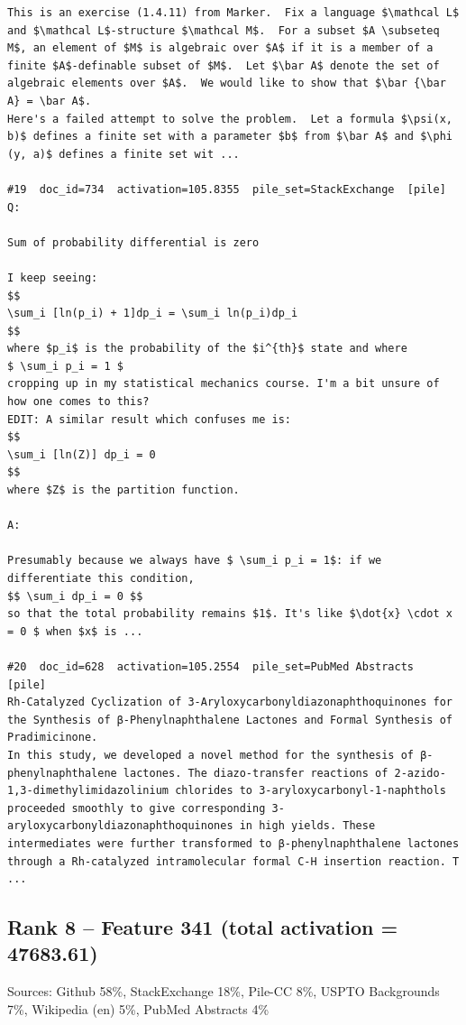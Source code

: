 \begin{verbatim}
This is an exercise (1.4.11) from Marker.  Fix a language $\mathcal L$ and $\mathcal L$-structure $\mathcal M$.  For a subset $A \subseteq M$, an element of $M$ is algebraic over $A$ if it is a member of a finite $A$-definable subset of $M$.  Let $\bar A$ denote the set of algebraic elements over $A$.  We would like to show that $\bar {\bar A} = \bar A$.
Here's a failed attempt to solve the problem.  Let a formula $\psi(x, b)$ defines a finite set with a parameter $b$ from $\bar A$ and $\phi (y, a)$ defines a finite set wit ...

#19  doc_id=734  activation=105.8355  pile_set=StackExchange  [pile]
Q:

Sum of probability differential is zero

I keep seeing:
$$
\sum_i [ln(p_i) + 1]dp_i = \sum_i ln(p_i)dp_i
$$
where $p_i$ is the probability of the $i^{th}$ state and where
$ \sum_i p_i = 1 $
cropping up in my statistical mechanics course. I'm a bit unsure of how one comes to this?
EDIT: A similar result which confuses me is:
$$
\sum_i [ln(Z)] dp_i = 0
$$
where $Z$ is the partition function.

A:

Presumably because we always have $ \sum_i p_i = 1$: if we differentiate this condition,
$$ \sum_i dp_i = 0 $$
so that the total probability remains $1$. It's like $\dot{x} \cdot x = 0 $ when $x$ is ...

#20  doc_id=628  activation=105.2554  pile_set=PubMed Abstracts  [pile]
Rh-Catalyzed Cyclization of 3-Aryloxycarbonyldiazonaphthoquinones for the Synthesis of β-Phenylnaphthalene Lactones and Formal Synthesis of Pradimicinone.
In this study, we developed a novel method for the synthesis of β-phenylnaphthalene lactones. The diazo-transfer reactions of 2-azido-1,3-dimethylimidazolinium chlorides to 3-aryloxycarbonyl-1-naphthols proceeded smoothly to give corresponding 3-aryloxycarbonyldiazonaphthoquinones in high yields. These intermediates were further transformed to β-phenylnaphthalene lactones through a Rh-catalyzed intramolecular formal C-H insertion reaction. T ...

\end{verbatim}

\subsection*{Rank 8 -- Feature 341 (total activation = 47683.61)}

Sources: Github 58\%, StackExchange 18\%, Pile-CC 8\%, USPTO Backgrounds 7\%, Wikipedia (en) 5\%, PubMed Abstracts 4\%

